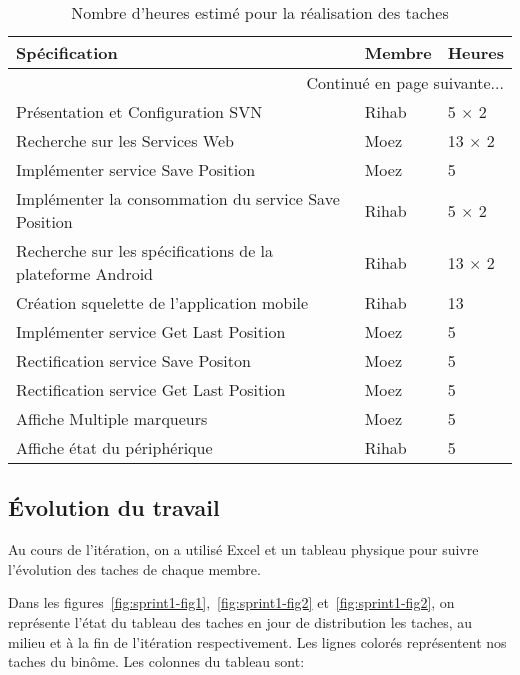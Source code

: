\begin{center}
    \begin{longtable}{| l | l | l |}
        \caption{Nombre d'heures estimé pour la réalisation des taches}
\label{tab:sprint1-estimation} \\

        \hline
        \textbf{Spécification} & \textbf{Membre} & \textbf{Heures} \\ \hline
        \endhead

        \hline \multicolumn{3}{|r|}{{Continué en page suivante$\dotsc$}} \\ \hline
        \endfoot

        \hline \hline
        \endlastfoot

        \hline
Présentation et Configuration SVN & Rihab & 5 $\times$ 2 \\ \hline
Recherche sur les Services Web & Moez & 13 $\times$ 2 \\ \hline
Implémenter service Save Position & Moez & 5 \\ \hline
Implémenter la consommation du service Save Position & Rihab & 5 $\times$ 2 \\ \hline
Recherche sur les spécifications de la plateforme Android & Rihab & 13 $\times$ 2 \\ \hline
Création squelette de l'application mobile & Rihab & 13 \\ \hline
Implémenter service Get Last Position & Moez & 5 \\ \hline
Rectification service Save Positon & Moez & 5 \\ \hline
Rectification service Get Last Position & Moez & 5 \\ \hline
Affiche Multiple marqueurs & Moez & 5 \\ \hline
Affiche état du périphérique & Rihab & 5 \\ \hline
    \end{longtable}
\end{center}

\subsection{Évolution du travail}

Au cours de l'itération, on a utilisé Excel et un tableau physique pour suivre
l'évolution des taches de chaque membre.

\clearpage %

Dans les figures~\ref{fig:sprint1-fig1},~\ref{fig:sprint1-fig2}
et~\ref{fig:sprint1-fig2}, on représente l'état du tableau des taches en jour
de distribution les taches, au milieu et à la fin de l'itération
respectivement. Les lignes colorés représentent nos taches du binôme. Les
colonnes du tableau sont:

